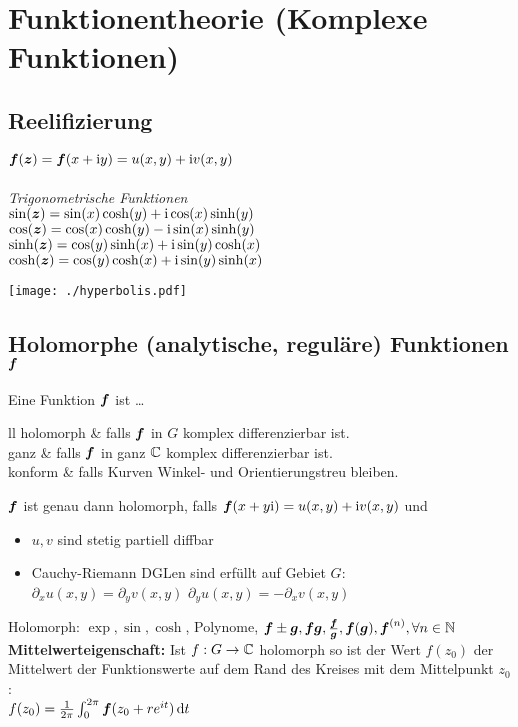 \documentclass[german,color,5pt]{latex4ei/latex4ei_fs}
\begin{document}
\section{Funktionentheorie (Komplexe Funktionen)}
\begin{sectionbox}
	\parbox{5cm}{
		\subsection{Reelifizierung}
		$\boldsymbol{f}(\boldsymbol{z}) = \boldsymbol{f}(x+\mathrm{i} y) = u(x,y) + \mathrm{i} v(x,y)$\\
		\\
		\emph{Trigonometrische Funktionen}\\
		$\sin(\boldsymbol{z}) = \sin(x)\cosh(y) + \mathrm{i} \cos(x)\sinh(y)$\\
		$\cos(\boldsymbol{z}) = \cos(x)\cosh(y) - \mathrm{i} \sin(x)\sinh(y)$\\
		$\sinh(\boldsymbol{z}) = \cos(y) \sinh(x) + \mathrm{i} \sin(y) \cosh(x)$\\
		$\cosh(\boldsymbol{z}) = \cos(y) \cosh(x) + \mathrm{i} \sin(y) \sinh(x)$
	}
	\parbox{1.5cm}{
		\texttt{[image: ./hyperbolis.pdf]} 
	}
\end{sectionbox}

\begin{sectionbox}
	\subsection{Holomorphe (analytische, reguläre) Funktionen $\boldsymbol{f}$}
	Eine Funktion $\boldsymbol{f}$ ist \dots
	\begin{tablebox}{ll}
		holomorph & falls $\boldsymbol{f}$ in $G$ komplex differenzierbar ist.\\
		ganz & falls $\boldsymbol{f}$ in ganz $\mathbb C$ komplex differenzierbar ist.\\
		konform & falls Kurven Winkel- und Orientierungstreu bleiben.\\

	\end{tablebox}
	$\boldsymbol{f}$ ist genau dann holomorph, falls $\boldsymbol{f}(x+y\mathrm{i}) = u(x,y) + \mathrm{i} v(x,y)$ und
	\begin{itemize}\itemsep0pt
		\item $u,v$ sind stetig partiell diffbar
		\item Cauchy-Riemann DGLen sind erfüllt auf Gebiet $G$:\\
		$\partial_x u(x,y) = \partial_y v(x,y)$ \qquad $\partial_y u(x,y) = - \partial_x v(x,y)$
	\end{itemize}
	Holomorph: $\exp, \sin, \cosh$, Polynome, $\boldsymbol{f}\pm \boldsymbol{g}, \boldsymbol{f} \boldsymbol{g}, \frac{\boldsymbol{f}}{\boldsymbol{g}}, \boldsymbol{f}(\boldsymbol{g}),\boldsymbol{f}^{(n)}, \forall n\in \mathbb{N}$ \\
	\textbf{Mittelwerteigenschaft:} Ist $f:G\rightarrow \mathbb C$ holomorph so ist der Wert $f(z_0)$ der Mittelwert der Funktionswerte auf dem Rand des Kreises mit dem Mittelpunkt $z_0$: \\
	$f(z_0)=\frac{1}{2\pi}\int_{0}^{2\pi}\cx f(z_0+r e^{it})\diff t$
\end{sectionbox}
\end{document}
